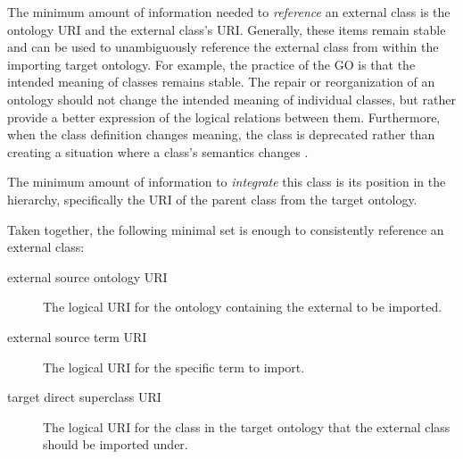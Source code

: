 \documentclass[a4paper,10pt,twocolumn]{article}
\begin{document}

The minimum amount of information needed to \textit{reference} an external class is the ontology URI and the external class's URI.
Generally, these items remain stable and can be used to unambiguously reference the external class from within the importing target ontology.
For example, the practice of the \ac{GO} \cite{RefWorks:79} is that the intended meaning of classes remains stable.
The repair or reorganization of an ontology should not change the intended meaning of individual classes, but rather provide a better expression of the logical relations between them.
Furthermore, when the class definition changes meaning, the class is deprecated rather than creating a situation where a class's semantics changes \cite{RefWorks:1560}.


The minimum amount of information to \textit{integrate} this class is its position in the hierarchy, specifically the URI of the parent class from the target ontology.


Taken together, the following minimal set is enough to consistently reference an external class:
\begin{description}
 \item[external source ontology URI] The logical URI for the ontology containing the external to be imported. %
 \item[external source term URI] The logical URI for the specific term to import. %
 \item[target direct superclass URI] The logical URI for the class in the target ontology that the external class should be imported under. %
 \end{description} 
 
\end{document}
